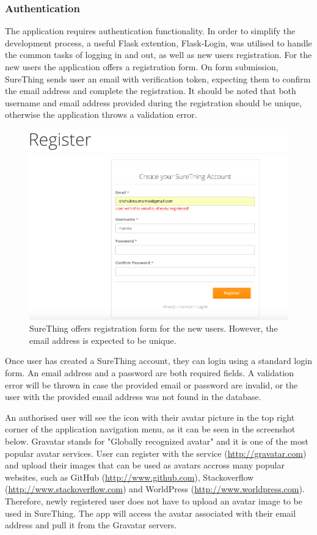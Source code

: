 \subsubsection*{Authentication}
The application requires authentication functionality. In order to simplify the development process, a useful Flask extention, Flask-Login, was utilised to handle the common tasks of logging in and out, as well as new users registration. For the new users the application offers a registration form. On form submission, SureThing sends user an email with verification token, expecting them to confirm the email address and complete the registration. It should be noted that both username and email address provided during the registration should be unique, otherwise the application throws a validation error.

\begin{figure}[H]
	\begin{center}
		\includegraphics[width=.90\columnwidth]{impl/images/registrationFormError}
		\caption{SureThing offers registration form for the new users. However, the email address is expected to be unique.} \label{fig:registrationformerror}
	\end{center}
\end{figure}

Once user has created a SureThing account, they can login using a standard login form.  An email address and a password are both required fields. A validation error will be thrown in case the provided email or password are invalid, or the user with the provided email address was not found in the database.

An authorised user will see the icon with their avatar picture in the top right corner of the application navigation menu, as it can be seen in the screenshot below. Gravatar stands for "Globally recognized avatar" and it is one of the most popular avatar services. User can register with the service (\url{http://gravatar.com}) and upload their images that can be used as avatars accross many popular websites, such as GitHub (\url{http://www.github.com}), Stackoverflow (\url{http://www.stackoverflow.com}) and WorldPress (\url{http://www.worldpress.com}). Therefore, newly registered user does not have to upload an avatar image to be used in SureThing. The app will access the avatar associated with their email address and pull it from the Gravatar servers. 

